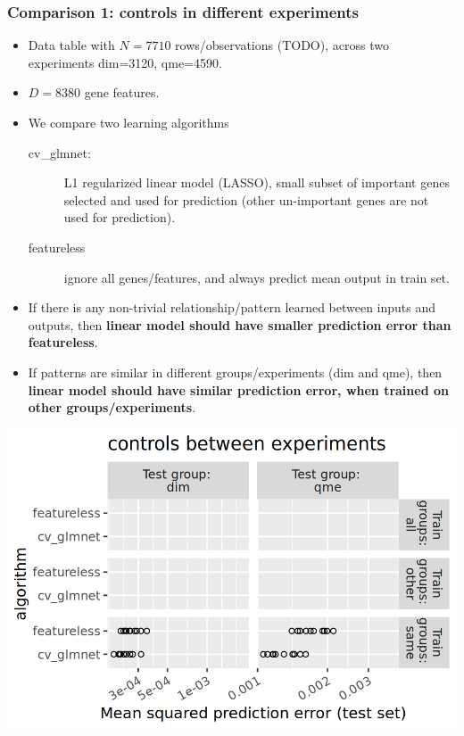 \documentclass{beamer}
\begin{document}
\begin{frame}
  \frametitle{Comparison 1: controls in different experiments}
  \begin{itemize}
  \item Data table with $N=7710$ rows/observations (TODO), across two
    experiments dim=3120, qme=4590.
  \item $D=8380$ gene features.
  \item We compare two learning algorithms
    \begin{description}
    \item[cv\_glmnet:] L1 regularized linear model (LASSO), small
      subset of important genes selected and used for prediction
      (other un-important genes are not used for prediction).
    \item[featureless] ignore all genes/features, and always predict
      mean output in train set.
    \end{description}
  \item If there is any non-trivial relationship/pattern learned
    between inputs and outputs, then \textbf{linear model should have
      smaller prediction error than featureless}.
  \item If patterns are similar in different groups/experiments (dim
    and qme), then \textbf{linear model should have similar prediction
      error, when trained on other groups/experiments}.
  \end{itemize}
\end{frame}

\begin{frame}
  \includegraphics[width=\textwidth]{qsip_pc2_all_new-controls.between.experiments.same.png}
\end{frame}
\end{document}
